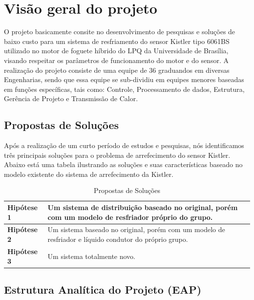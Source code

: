\chapter{Visão geral do projeto}
    
    O projeto basicamente consite no desenvolvimento de pesquisas e soluções de baixo custo para um sistema de 
    resfriamento do sensor Kistler tipo 6061BS utilizado no motor de foguete híbrido do LPQ da 
    Universidade de Brasília, visando respeitar os parâmetros de funcionamento do motor e do sensor.
    A realização do projeto consiste de uma equipe de 36 graduandos em diversas Engenharias, sendo que
    essa equipe se sub-dividiu em equipes menores baseadas em funções específicas, tais como: Controle, Processamento
    de dados, Estrutura, Gerência de Projeto e Transmissão de Calor.

\section{Propostas de Soluções}

    Após a realização de um curto período de estudos e pesquisas, nós identificamos três principais
    soluções para o problema de arrefecimento do sensor Kistler. Abaixo está uma tabela ilustrando as
    soluções e suas características baseado no modelo existente do sistema de arrefecimento da Kistler.

    \begin{table}[!htb]
        \centering
        \begin{tabular}{p{5cm}p{10cm}}
          \toprule
          \textbf{Hipótese 1}  &     Um sistema de distribuição baseado no original, 
                                    porém com um modelo de resfriador próprio do grupo.                             \\ \midrule
          \textbf{Hipótese 2} &     Um sistema baseado no original, 
                                    porém com um modelo de resfriador e líquido condutor do próprio grupo.   \\ \midrule
          \textbf{Hipótese 3} &     Um sistema totalmente novo.                      \\
          \bottomrule
        \end{tabular}
        \caption{Propostas de Soluções}
      \end{table}

\section{Estrutura Analítica do Projeto (EAP)}

